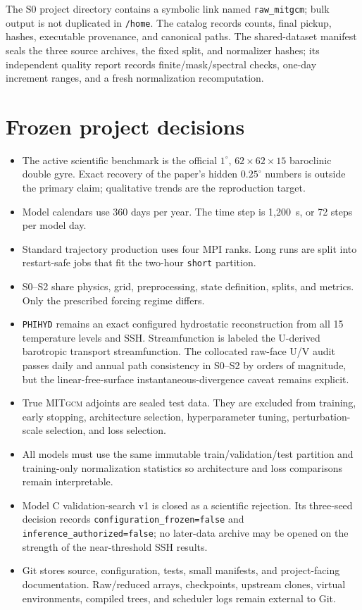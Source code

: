 \documentclass[11pt]{article}
\newcommand{\MITgcm}{\textsc{MITgcm}}
\begin{document}
The S0 project directory contains a symbolic link named \texttt{raw\_mitgcm}; bulk
output is not duplicated in \texttt{/home}.  The catalog records counts, final pickup,
hashes, executable provenance, and canonical paths.  The shared-dataset manifest seals
the three source archives, the fixed split, and normalizer hashes; its independent
quality report records finite/mask/spectral checks, one-day increment ranges, and a
fresh normalization recomputation.

\section{Frozen project decisions}

\begin{itemize}
\item The active scientific benchmark is the official $1^\circ$, $62\times62\times15$
  baroclinic double gyre.  Exact recovery of the paper's hidden $0.25^\circ$ numbers is
  outside the primary claim; qualitative trends are the reproduction target.
\item Model calendars use 360 days per year.  The time step is 1,200~s, or 72 steps per
  model day.
\item Standard trajectory production uses four MPI ranks.  Long runs are split into
  restart-safe jobs that fit the two-hour \texttt{short} partition.
\item S0--S2 share physics, grid, preprocessing, state definition, splits, and metrics.
  Only the prescribed forcing regime differs.
\item \texttt{PHIHYD} remains an exact configured hydrostatic reconstruction from all
  15 temperature levels and SSH.  Streamfunction is labeled the U-derived barotropic
  transport streamfunction.  The collocated raw-face U/V audit passes daily and annual
  path consistency in S0--S2 by orders of magnitude, but the linear-free-surface
  instantaneous-divergence caveat remains explicit.
\item True \MITgcm{} adjoints are sealed test data.  They are excluded from training,
  early stopping, architecture selection, hyperparameter tuning, perturbation-scale
  selection, and loss selection.
\item All models must use the same immutable train/validation/test partition and
  training-only normalization statistics so architecture and loss comparisons remain
  interpretable.
\item Model C validation-search v1 is closed as a scientific rejection.  Its three-seed
  decision records \texttt{configuration\_frozen=false} and
  \texttt{inference\_authorized=false}; no later-data archive may be opened on the
  strength of the near-threshold SSH results.
\item Git stores source, configuration, tests, small manifests, and project-facing
  documentation.  Raw/reduced arrays, checkpoints, upstream clones, virtual
  environments, compiled trees, and scheduler logs remain external to Git.
\end{itemize}
\end{document}
